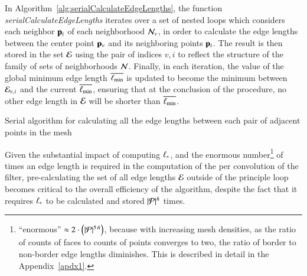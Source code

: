 In Algorithm~\ref{alg:serialCalculateEdgeLengths}, the function \textit{serialCalculateEdgeLengths} iterates over a set of nested loops which considers each neighbor $\mathbf{p}_i$ of each neighborhood $\mathcal{N}_v$, in order to calculate the edge lengths between the center point $\mathbf{p}_v$ and its neighboring points $\mathbf{p}_i$. The result is then stored in the set $\mathcal{E}$ using the pair of indices $v, i$ to reflect the structure of the family of sets of neighborhoods $\mathcal{N}$. Finally, in each iteration, the value of the global minimum edge length $\overline{\ell_\text{min}}$ is updated to become the minimum between $\mathcal{E}_{v,\kern.75pt i}$ and the current $\overline{\ell_\text{min}}$, ensuring that at the conclusion of the procedure, no other edge length in $\mathcal{E}$ will be shorter than $\overline{\ell_\text{min}}$.

\begin{algorithm}[ht]
	\DontPrintSemicolon


	\bigskip
\nl	{}
	\caption{Serial algorithm for calculating all the edge lengths between each pair of adjacent points in the mesh\label{alg:serialCalculateEdgeLengths}}
\end{algorithm}

Given the substantial impact of computing ${\ell_\ast}$, and the enormous number\footnote{``enormous'' $\approx2\cdot\left (|\mathcal{P}|^{5\,\bar{n}}\right )$, because with increasing mesh densities, as the ratio of counts of faces to counts of points converges to two, the ratio of border to non-border edge lengths diminishes. This is described in detail in the Appendix~\ref{apdx1}.} of times an edge length is required in the computation of the  per convolution of the filter, pre-calculating the set of all edge lengths $\mathcal{E}$ outside of the principle loop becomes critical to the overall efficiency of the algorithm, despite the fact that it requires ${\ell_\ast}$ to be calculated and stored $|\mathcal{P}|^{\bar{n}}$ times.

